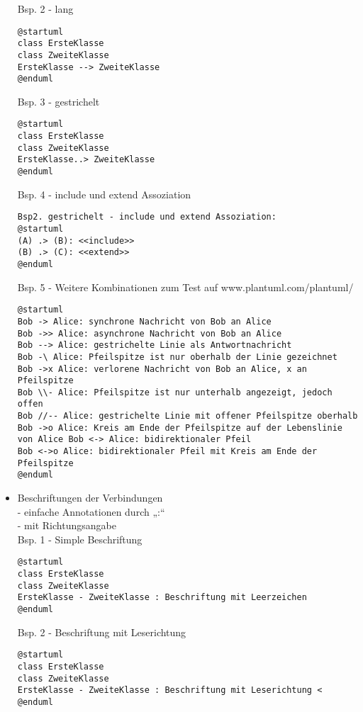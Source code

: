 \begin{itemize}
Bsp. 2 - lang\\
\begin{lstlisting}
@startuml
class ErsteKlasse
class ZweiteKlasse
ErsteKlasse --> ZweiteKlasse
@enduml
\end{lstlisting}
Bsp. 3 - gestrichelt\\
\begin{lstlisting}
@startuml
class ErsteKlasse
class ZweiteKlasse
ErsteKlasse..> ZweiteKlasse
@enduml
\end{lstlisting}
Bsp. 4 - include und extend Assoziation\\
\begin{lstlisting}
Bsp2. gestrichelt - include und extend Assoziation:
@startuml
(A) .> (B): <<include>>
(B) .> (C): <<extend>>
@enduml
\end{lstlisting}
Bsp. 5 - Weitere Kombinationen zum Test auf www.plantuml.com/plantuml/\\
\begin{lstlisting}
@startuml
Bob -> Alice: synchrone Nachricht von Bob an Alice
Bob ->> Alice: asynchrone Nachricht von Bob an Alice
Bob --> Alice: gestrichelte Linie als Antwortnachricht
Bob -\ Alice: Pfeilspitze ist nur oberhalb der Linie gezeichnet
Bob ->x Alice: verlorene Nachricht von Bob an Alice, x an Pfeilspitze
Bob \\- Alice: Pfeilspitze ist nur unterhalb angezeigt, jedoch offen
Bob //-- Alice: gestrichelte Linie mit offener Pfeilspitze oberhalb
Bob ->o Alice: Kreis am Ende der Pfeilspitze auf der Lebenslinie von Alice Bob <-> Alice: bidirektionaler Pfeil
Bob <->o Alice: bidirektionaler Pfeil mit Kreis am Ende der Pfeilspitze
@enduml
\end{lstlisting}
\item Beschriftungen der Verbindungen\\
- einfache Annotationen durch „:“\\
- mit Richtungsangabe\\
Bsp. 1 - Simple Beschriftung\\
\begin{lstlisting}
@startuml
class ErsteKlasse
class ZweiteKlasse
ErsteKlasse - ZweiteKlasse : Beschriftung mit Leerzeichen
@enduml
\end{lstlisting}
Bsp. 2 - Beschriftung mit Leserichtung\\
\begin{lstlisting}
@startuml
class ErsteKlasse
class ZweiteKlasse
ErsteKlasse - ZweiteKlasse : Beschriftung mit Leserichtung <
@enduml
\end{lstlisting}

\end{itemize}
